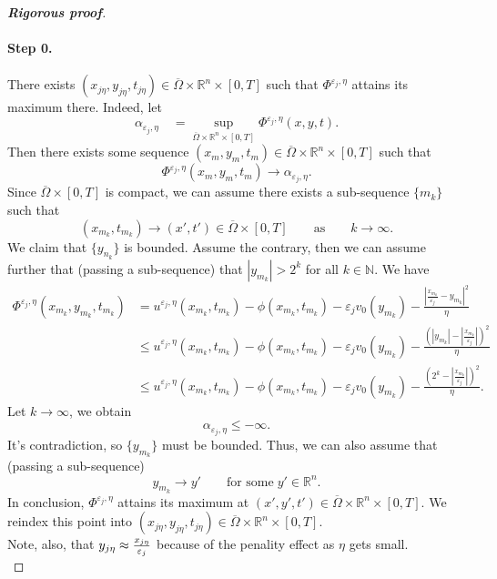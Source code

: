 \documentclass[12pt, oneside]{amsart}  	%
\begin{document}
\begin{proof}[\textbf{Rigorous proof}]
\paragraph{\textbf{Step 0.}} There exists $\left(x_{j\eta},y_{j\eta},t_{j\eta}\right)\in \overline{\Omega}\times\mathbb{R}^n\times [0,T]$ such that $\Phi^{\varepsilon_j,\eta}$ attains its maximum there. Indeed, let
\begin{equation*}
\alpha_{\varepsilon_j,\eta}\quad  = \sup_{ \overline{\Omega}\times\mathbb{R}^n\times [0,T]} \Phi^{\varepsilon_j,\eta} (x,y,t).
\end{equation*}
Then there exists some sequence $(x_m,y_m,t_m)\in \overline{\Omega}\times\mathbb{R}^n\times [0,T]$ such that
\begin{equation*}
\Phi^{\varepsilon_j, \eta}(x_m,y_m,t_m)\longrightarrow \alpha_{\varepsilon_j,\eta}.
\end{equation*}
Since $\overline{\Omega}\times [0,T]$ is compact, we can assume there exists a sub-sequence $\{m_k\}$ such that $$\left(x_{m_k},t_{m_k}\right) \longrightarrow (x',t')\in \overline{\Omega}\times[0,T]\qquad\text{as}\qquad k\longrightarrow\infty.$$
We claim that $\{y_{n_k}\}$ is bounded. Assume the contrary, then we can assume further that (passing a sub-sequence) that $\left|y_{m_k}\right| > 2^k$ for all $k\in \mathbb{N}$. We have
\begin{align*}
\Phi^{\varepsilon_j,\eta}\left(x_{m_k},y_{m_k},t_{m_k}\right) &= u^{\varepsilon_j,\eta}\left(x_{m_k},t_{m_k}\right) - \phi\left(x_{m_k},t_{m_k}\right) - \varepsilon_jv_0\left(y_{m_k}\right) - \frac{\left|\frac{x_{m_k}}{\varepsilon_j} - y_{m_k}\right|^2}{\eta}\\
&\leq u^{\varepsilon_j,\eta}\left(x_{m_k},t_{m_k}\right) - \phi\left(x_{m_k},t_{m_k}\right) - \varepsilon_jv_0\left(y_{m_k}\right) - \frac{\left( \left|y_{m_k}\right| - \left|\frac{x_{m_k}}{\varepsilon_j}\right|   \right)^2}{\eta}\\
&\leq u^{\varepsilon_j,\eta}\left(x_{m_k},t_{m_k}\right) - \phi\left(x_{m_k},t_{m_k}\right) - \varepsilon_jv_0\left(y_{m_k}\right) - \frac{\left( 2^k - \left|\frac{x_{m_k}}{\varepsilon_j}\right|   \right)^2}{\eta}.
\end{align*}
Let $k\longrightarrow\infty$, we obtain
\begin{equation*}
\alpha_{\varepsilon_j,\eta} \leq -\infty.
\end{equation*}
It's contradiction, so $\{y_{m_k}\}$ must be bounded. Thus, we can also assume that (passing a sub-sequence)
\begin{equation*}
y_{m_k} \longrightarrow y' \qquad\text{for some}\;y'\in \mathbb{R}^n.
\end{equation*}
In conclusion, $\Phi^{\varepsilon_j,\eta}$ attains its maximum at $(x',y',t') \in \overline{\Omega} \times \mathbb{R}^n\times [0,T]$. We reindex this point into $\left(x_{j\eta},y_{j\eta},t_{j\eta}\right)\in \overline{\Omega}\times\mathbb{R}^n\times [0,T]$.\\
Note, also, that $y_{j\eta}\approx \frac{x_{j\eta}}{\varepsilon_j}$ because of the penality effect as $\eta$ gets small.\\


\end{proof}
\end{document}
